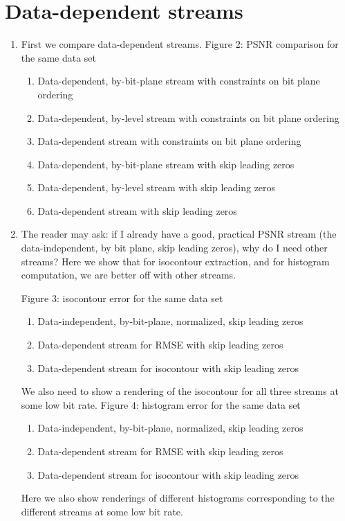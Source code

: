 \section{Data-dependent streams}

\begin{enumerate}
  \item First we compare data-dependent streams. Figure 2: PSNR comparison for the same data set
  \begin{enumerate}
    \item Data-dependent, by-bit-plane stream with constraints on bit plane ordering
    \item Data-dependent, by-level stream with constraints on bit plane ordering
    \item Data-dependent stream with constraints on bit plane ordering
    \item Data-dependent, by-bit-plane stream with skip leading zeros
    \item Data-dependent, by-level stream with skip leading zeros
    \item Data-dependent stream with skip leading zeros
  \end{enumerate}

  \item The reader may ask: if I already have a good, practical PSNR stream (the data-independent, by bit plane, skip leading zeros), why do I need other streams? Here we show that for isocontour extraction, and for histogram computation, we are better off with other streams.
  
  Figure 3: isocontour error for the same data set
    \begin{enumerate}
      \item Data-independent, by-bit-plane, normalized, skip leading zeros
      \item Data-dependent stream for RMSE with skip leading zeros
      \item Data-dependent stream for isocontour with skip leading zeros
    \end{enumerate}
  We also need to show a rendering of the isocontour for all three streams at some low bit rate.
  Figure 4: histogram error for the same data set
    \begin{enumerate}
      \item Data-independent, by-bit-plane, normalized, skip leading zeros
      \item Data-dependent stream for RMSE with skip leading zeros
      \item Data-dependent stream for isocontour with skip leading zeros
  \end{enumerate}  
  Here we also show renderings of different histograms corresponding to the different streams at some low bit rate.
\end{enumerate}
